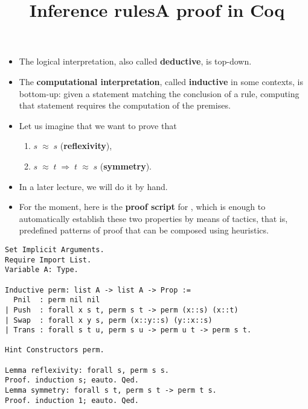 \documentclass[wide]{slides}
\begin{document}
\begin{slide}
  \title{Inference rules}

  \begin{itemize}

    \item The logical interpretation, also called \textbf{deductive},
      is top\hyp{}down.

    \item The \textbf{computational interpretation}, called
      \textbf{inductive} in some contexts, is bottom\hyp{}up: given a
      statement matching the conclusion of a rule, computing that
      statement requires the computation of the premises.

    \item Let us imagine that we want to prove that
      \begin{enumerate}

        \item \(s \;\approx\; s\) (\textbf{reflexivity}),

        \item \(s \;\approx\; t \;\Rightarrow\; t \;\approx\; s\)
          (\textbf{symmetry}).

      \end{enumerate}

    \item In a later lecture, we will do it by hand.

    \item For the moment, here is the \textbf{proof script} for \Coq,
      which is enough to automatically establish these two properties
      by means of tactics, that is, predefined patterns of proof that
      can be composed using heuristics.

  \end{itemize}

\end{slide}

\begin{slide}
  \title{A proof in Coq}
\begin{verbatim}
Set Implicit Arguments.
Require Import List.
Variable A: Type.

Inductive perm: list A -> list A -> Prop :=
  Pnil  : perm nil nil
| Push  : forall x s t, perm s t -> perm (x::s) (x::t)
| Swap  : forall x y s, perm (x::y::s) (y::x::s)
| Trans : forall s t u, perm s u -> perm u t -> perm s t.

Hint Constructors perm.

Lemma reflexivity: forall s, perm s s.
Proof. induction s; eauto. Qed.
Lemma symmetry: forall s t, perm s t -> perm t s.
Proof. induction 1; eauto. Qed.
\end{verbatim}

\end{slide}
\end{document}
